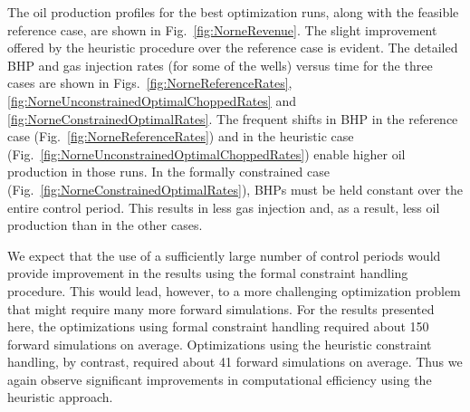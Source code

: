 \documentclass[twocolumn,numbook]{svjour3}          %
\begin{document}
The oil production profiles for the best optimization runs, along with the
feasible reference case, are shown in Fig.~\ref{fig:NorneRevenue}. The slight
improvement offered by the heuristic procedure over the reference case is
evident. The detailed BHP and gas injection rates (for some of the wells) versus time for the three
cases are shown in Figs.~\ref{fig:NorneReferenceRates},
\ref{fig:NorneUnconstrainedOptimalChoppedRates} and
\ref{fig:NorneConstrainedOptimalRates}. The frequent shifts in BHP in the
reference case (Fig.~\ref{fig:NorneReferenceRates}) and in the heuristic
case (Fig.~\ref{fig:NorneUnconstrainedOptimalChoppedRates}) enable higher
oil production in those runs. In the formally constrained case
(Fig.~\ref{fig:NorneConstrainedOptimalRates}), BHPs must be held constant over
the entire control period. This results in less gas injection and, as a
result, less oil production than in the other cases.


We expect that the use of a sufficiently large number of control periods would
provide improvement in the results using the formal constraint handling
procedure. This would lead, however, to a more challenging optimization problem
that might require many more forward simulations. For the results presented
here, the optimizations using formal constraint handling required about 150
forward simulations on average. Optimizations using the heuristic constraint
handling, by contrast, required about 41 forward simulations on average. Thus we
again observe significant improvements in computational efficiency using the
heuristic approach.
\end{document}
